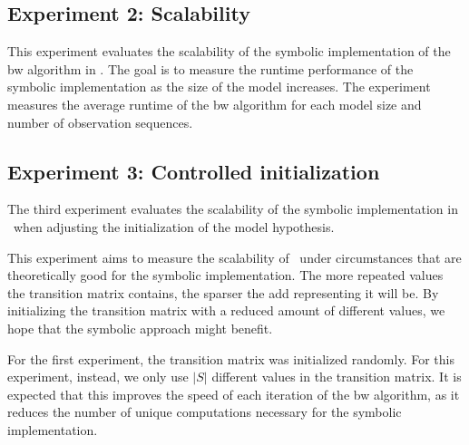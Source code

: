 \subsection{Experiment 2: Scalability}\label{sec:exp_scalability}
This experiment evaluates the scalability of the symbolic implementation of the \gls{bw} algorithm in \Cupaal.
The goal is to measure the runtime performance of the symbolic implementation as the size of the model increases.
The experiment measures the average runtime of the \gls{bw} algorithm for each model size and number of observation sequences.





\subsection{Experiment 3: Controlled initialization}\label{sec:exp_extra_scalability}
The third experiment evaluates the scalability of the symbolic implementation in \Cupaal\ when adjusting the initialization of the model hypothesis.

This experiment aims to measure the scalability of \Cupaal\ under circumstances that are theoretically good for the symbolic implementation.
The more repeated values the transition matrix contains, the sparser the \gls{add} representing it will be.
By initializing the transition matrix with a reduced amount of different values, we hope that the symbolic approach might benefit.

For the first experiment, the transition matrix was initialized randomly.
For this experiment, instead, we only use $|S|$ different values in the transition matrix.
It is expected that this improves the speed of each iteration of the \gls{bw} algorithm, as it reduces the number of unique computations necessary for the symbolic implementation.
